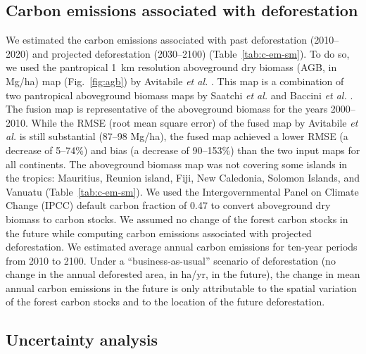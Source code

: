 \documentclass[
  12pt,
]{article}
\begin{document}
\hypertarget{carbon-emissions-associated-with-deforestation}{%
\subsection{Carbon emissions associated with deforestation}\label{carbon-emissions-associated-with-deforestation}}

We estimated the carbon emissions associated with past deforestation (2010--2020) and projected deforestation (2030--2100) (Table~\ref{tab:c-em-sm}). To do so, we used the pantropical 1~km resolution aboveground dry biomass (AGB, in Mg/ha) map (Fig.~\ref{fig:agb}) by Avitabile \emph{et al.} \citep{Avitabile2016}. This map is a combination of two pantropical aboveground biomass maps by Saatchi \emph{et al.} \citep{Saatchi2011} and Baccini \emph{et al.} \citep{Baccini2012}. The fusion map is representative of the aboveground biomass for the years 2000--2010. While the RMSE (root mean square error) of the fused map by Avitabile \emph{et al.} \citep{Avitabile2016} is still substantial (87--98 Mg/ha), the fused map achieved a lower RMSE (a decrease of 5--74\%) and bias (a decrease of 90--153\%) than the two input maps for all continents. The aboveground biomass map was not covering some islands in the tropics: Mauritius, Reunion island, Fiji, New Caledonia, Solomon Islands, and Vanuatu (Table~\ref{tab:c-em-sm}). We used the Intergovernmental Panel on Climate Change (IPCC) default carbon fraction of 0.47 \citep{McGroddy2004} to convert aboveground dry biomass to carbon stocks. We assumed no change of the forest carbon stocks in the future while computing carbon emissions associated with projected deforestation. We estimated average annual carbon emissions for ten-year periods from 2010 to 2100. Under a ``business-as-usual'' scenario of deforestation (no change in the annual deforested area, in ha/yr, in the future), the change in mean annual carbon emissions in the future is only attributable to the spatial variation of the forest carbon stocks and to the location of the future deforestation.

\hypertarget{uncertainty-analysis}{%
\subsection{Uncertainty analysis}\label{uncertainty-analysis}}
\end{document}
